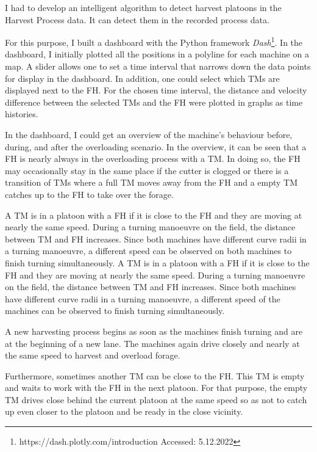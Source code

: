 I had to develop an intelligent algorithm to detect harvest platoons in the Harvest Process data. It can detect them in the recorded process data.

For this purpose, I built a dashboard with the Python framework \textit{Dash}\footnote{https://dash.plotly.com/introduction Accessed: 5.12.2022}. In the dashboard, I initially plotted all the positions in a polyline for each machine
on a map. A slider allows one to set a time interval that narrows down the data
points for display in the dashboard. In addition, one could select which \ac{TM}s are displayed next to the \ac{FH}. For the chosen time interval, the distance and velocity difference between the selected \ac{TM}s and the \ac{FH} were plotted in graphs as time histories. 

In the dashboard, I could get an overview of the machine's behaviour 
before, during, and after the overloading scenario.
In the overview, it can be seen that a \ac{FH} is nearly always in the overloading process with a \ac{TM}. In doing so, the \ac{FH} may occasionally stay in the same place if the cutter is clogged or there is a transition of \ac{TM}s where a full \ac{TM} moves away from the \ac{FH} and  a  empty \ac{TM} catches up to the \ac{FH} to take over the forage.

A \ac{TM} is in a platoon with a  \ac{FH} if it is close to the \ac{FH} and they are moving at nearly the same speed. During a turning manoeuvre on the field, the distance between \ac{TM} and \ac{FH} increases. Since both machines have different curve radii in a turning manoeuvre, a different speed can be observed on both machines to finish turning simultaneously.
A \ac{TM} is in a platoon with a  \ac{FH} if it is close to the \ac{FH} and they are moving at nearly the same speed. During a turning manoeuvre on the field, the distance between \ac{TM} and \ac{FH} increases. Since both machines have different curve radii in a turning manoeuvre, a different speed of the machines can be observed to finish turning simultaneously.

A new harvesting process begins as soon as the machines finish turning and are at the beginning of a new lane.
The machines again drive closely and nearly at the same speed to harvest and overload forage.

Furthermore, sometimes another \ac{TM} can be close to the \ac{FH}. This \ac{TM} is empty and waits to work with the \ac{FH} in the next platoon. For that purpose, the empty \ac{TM} drives close behind the current platoon at the same speed so as not to catch up even closer to the platoon and be ready in the close vicinity.

